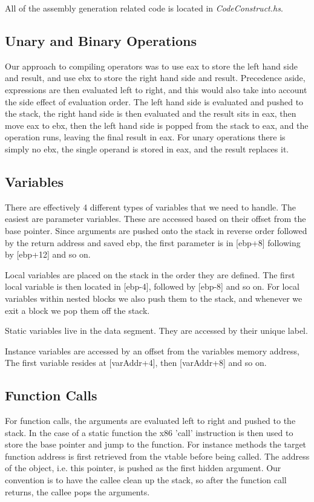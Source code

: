 \documentclass[12pt,letterpaper]{article}
\begin{document}
All of the assembly generation related code is located in \emph{CodeConstruct.hs}.

\subsection{Unary and Binary Operations}
Our approach to compiling operators was to use eax to store the left hand side and result, and use ebx to store the right hand side and result.
Precedence aside, expressions are then evaluated left to right, and this would also take into account the side effect of evaluation order.
The left hand side is evaluated and pushed to the stack, the right hand side is then evaluated and the result sits in eax, then move eax to ebx, then the left hand side is popped from the stack to eax, and the operation runs, leaving the final result in eax.
For unary operations there is simply no ebx, the single operand is stored in eax, and the result replaces it.

\subsection{Variables}
There are effectively 4 different types of variables that we need to handle.
The easiest are parameter variables. These are accessed based on their offset from the base pointer.
Since arguments are pushed onto the stack in reverse order followed by the return address and saved ebp, the first parameter is in [ebp+8] following by [ebp+12] and so on.

Local variables are placed on the stack in the order they are defined. The first local variable is then located in [ebp-4], followed by [ebp-8] and so on.
For local variables within nested blocks we also push them to the stack, and whenever we exit a block we pop them off the stack.

Static variables live in the data segment. They are accessed by their unique label.

Instance variables are accessed by an offset from the variables memory address, The first variable resides at [varAddr+4], then [varAddr+8] and so on.

\subsection{Function Calls}
For function calls, the arguments are evaluated left to right and pushed to the stack.
In the case of a static function the x86 'call' instruction is then used to store the base pointer and jump to the function.
For instance methods the target function address is first retrieved from the vtable before being called.
The address of the object, i.e. this pointer, is pushed as the first hidden argument.
Our convention is to have the callee clean up the stack, so after the function call returns, the callee pops the arguments.
\end{document}

